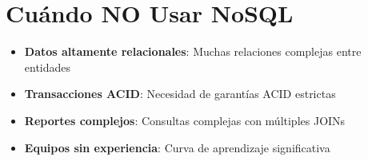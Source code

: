\documentclass[12pt]{article}
\begin{document}
\section{Cuándo NO Usar NoSQL}
\begin{itemize}
    \item \textbf{Datos altamente relacionales}: Muchas relaciones complejas entre entidades
    \item \textbf{Transacciones ACID}: Necesidad de garantías ACID estrictas
    \item \textbf{Reportes complejos}: Consultas complejas con múltiples JOINs
    \item \textbf{Equipos sin experiencia}: Curva de aprendizaje significativa
\end{itemize}
\end{document}
